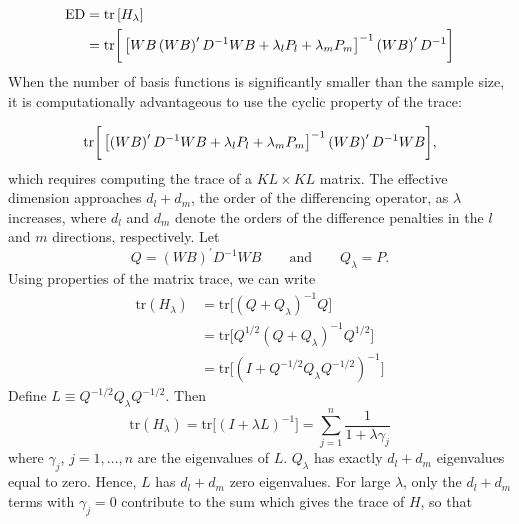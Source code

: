 \documentclass[12pt]{article}
\theoremstyle{definition}
\begin{document}
\begin{align}
\begin{split} \label{eq:hat-matrix-trace}
\textup{ED} &= \textup{tr} \left[ H_\lambda \right]\\
&= \textup{tr}\bigg[\left[WB \left(WB\right)^\prime D^{-1}WB +  \lambda_l P_l+ \lambda_m P_m\right]^{-1} \left(W B\right)^\prime D^{-1}  \bigg]
\end{split}
\end{align}
\noindent
When the number of basis functions is significantly smaller than the sample size, it is computationally advantageous to use the cyclic property of the trace: 

\begin{equation*}
\textup{tr}\bigg[\left[ \left(WB\right)^\prime D^{-1}WB +  \lambda_l P_l+ \lambda_m P_m\right]^{-1} \left(W B\right)^\prime D^{-1} WB  \bigg],
\end{equation*}
\noindent
which requires computing the trace of a $KL \times KL$ matrix. The effective dimension approaches $d_l + d_m$, the order of the differencing operator, as $\lambda$ increases, where $d_l$ and $d_m$ denote the orders of the difference penalties in the $l$ and $m$ directions, respectively.  Let
\begin{equation*}
Q = \left(W B\right)^\prime D^{-1} WB \qquad \mbox{and} \qquad Q_\lambda = P.
\end{equation*}
Using properties of the matrix trace, we can write
\begin{align*}
\mbox{tr}\left(H_\lambda \right) &= \mbox{tr}\bigg[ \left(Q + Q_\lambda \right)^{-1}Q \bigg]\\
&=\mbox{tr}\bigg[ Q^{1/2}\left(Q + Q_\lambda \right)^{-1}Q^{1/2} \bigg] \\
&=\mbox{tr}\bigg[\left(I + Q^{-{1/2}}Q_\lambda Q^{-{1/2}} \right)^{-1} \bigg]
\end{align*}
Define $L \equiv Q^{-{1/2}}Q_\lambda Q^{-{1/2}}$. Then
\begin{equation*}
\mbox{tr}\left(H_\lambda \right) = \mbox{tr}\bigg[\left(I + \lambda L \right)^{-1} \bigg] = \sum_{j=1}^n \frac{1}{1 + \lambda \gamma_j}
\end{equation*}
 where $\gamma_j$, $j=1,\dots,n$ are the eigenvalues of $L$. $Q_\lambda$ has exactly $d_l + d_m$ eigenvalues equal to zero. Hence, $L$ has $d_l + d_m$ zero eigenvalues. For large $\lambda$, only the $d_l + d_m$ terms with $\gamma_j=0$ contribute to the sum which gives the trace of $H$, so that
\end{document}
